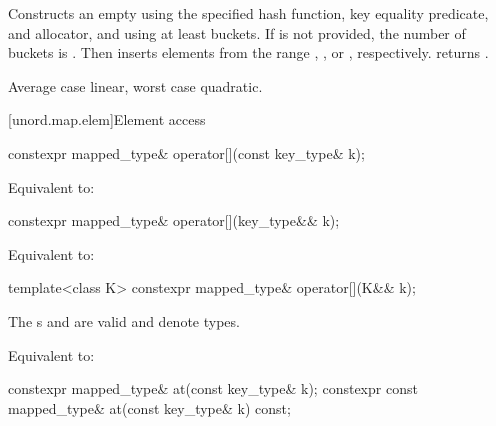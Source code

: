 \begin{itemdescr}
\pnum
\effects
Constructs an empty  using the
specified hash function, key equality predicate, and allocator, and
using at least  buckets. If  is not
provided, the number of buckets is . Then
inserts elements from the range , , or ,
respectively.
 returns .

\pnum
\complexity
Average case linear, worst case quadratic.
\end{itemdescr}

[unord.map.elem]{Element access}

%
%
\begin{itemdecl}
constexpr mapped_type& operator[](const key_type& k);
\end{itemdecl}

\begin{itemdescr}
\pnum
\effects
Equivalent to: 
\end{itemdescr}

%
%
\begin{itemdecl}
constexpr mapped_type& operator[](key_type&& k);
\end{itemdecl}

\begin{itemdescr}
\pnum
\effects
Equivalent to: 
\end{itemdescr}

%
%
\begin{itemdecl}
template<class K> constexpr mapped_type& operator[](K&& k);
\end{itemdecl}

\begin{itemdescr}
\pnum
\constraints
The s  and
 are valid and denote types.

\pnum
\effects
Equivalent to: 
\end{itemdescr}

%
%
\begin{itemdecl}
constexpr mapped_type& at(const key_type& k);
constexpr const mapped_type& at(const key_type& k) const;
\end{itemdecl}

